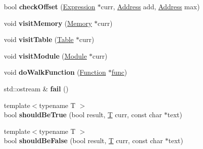 \begin{DoxyCompactItemize}
bool {\bfseries check\+Offset} (\mbox{\hyperlink{classwasm_1_1_expression}{Expression}} $\ast$curr, \mbox{\hyperlink{structwasm_1_1_address}{Address}} add, \mbox{\hyperlink{structwasm_1_1_address}{Address}} max)
\item 
\mbox{\label{structwasm_1_1_wasm_validator_ad592fc11f9185a778cc3e4669a79c6ba}} 
void {\bfseries visit\+Memory} (\mbox{\hyperlink{classwasm_1_1_memory}{Memory}} $\ast$curr)
\item 
\mbox{\label{structwasm_1_1_wasm_validator_a6ac7b5be3c3f8c4b89a7da2552dfff6c}} 
void {\bfseries visit\+Table} (\mbox{\hyperlink{classwasm_1_1_table}{Table}} $\ast$curr)
\item 
\mbox{\label{structwasm_1_1_wasm_validator_ac46b7435162c8439283952a836324d3a}} 
void {\bfseries visit\+Module} (\mbox{\hyperlink{classwasm_1_1_module}{Module}} $\ast$curr)
\item 
\mbox{\label{structwasm_1_1_wasm_validator_a5b837a19a50c194a289758d43770be74}} 
void {\bfseries do\+Walk\+Function} (\mbox{\hyperlink{classwasm_1_1_function}{Function}} $\ast$\mbox{\hyperlink{structfunc}{func}})
\item 
\mbox{\label{structwasm_1_1_wasm_validator_afa4578f301acaa5233b13b2de5446d8b}} 
std\+::ostream \& {\bfseries fail} ()
\item 
\mbox{\label{structwasm_1_1_wasm_validator_a96a3ff3f2a8dc2117405a6f85acd3434}} 
{\footnotesize template$<$typename T $>$ }\\bool {\bfseries should\+Be\+True} (bool result, \mbox{\hyperlink{struct_t}{T}} curr, const char $\ast$text)
\item 
\mbox{\label{structwasm_1_1_wasm_validator_abf2954ae84382c7418629bdddf392363}} 
{\footnotesize template$<$typename T $>$ }\\bool {\bfseries should\+Be\+False} (bool result, \mbox{\hyperlink{struct_t}{T}} curr, const char $\ast$text)
\item 
\mbox{\label{structwasm_1_1_wasm_validator_afb80f4a5fe8237eb9607745d89933fd4}} 

\end{DoxyCompactItemize}
